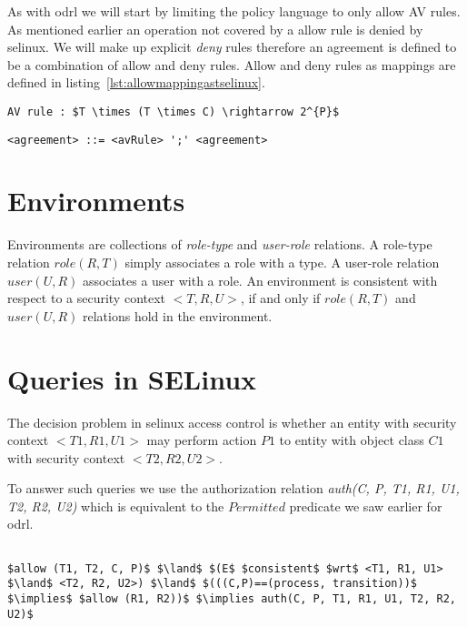 As with \ac{odrl} we will start by limiting the policy language to only allow AV rules. As mentioned earlier an operation not covered by a allow rule is denied by \ac{selinux}. We will make up explicit \emph{deny} rules therefore an agreement is defined to be a combination of allow and deny rules. Allow and deny rules as mappings are defined in listing~\ref{lst:allowmappingastselinux}.

\lstset{language=AST}
\begin{lstlisting}[frame=single, caption={'allow'/'deny' Rule as a Mapping},label={lst:allowmappingastselinux}]
AV rule : $T \times (T \times C) \rightarrow 2^{P}$
\end{lstlisting}

\lstset{language=AST}
\begin{lstlisting}[frame=single, caption={\ac{selinux} Agreement},label={lst:agreementastselinux}]
<agreement> ::= <avRule> ';' <agreement> 
\end{lstlisting}


\section{Environments}

Environments are collections of \emph{role-type} and \emph{user-role} relations. A role-type relation $role(R, T)$ simply associates a role with a type. A user-role relation $user(U, R)$ associates a user with a role. An environment is consistent with respect to a security context $<T, R, U>$, if and only if $role(R, T)$ and $user(U, R)$ relations hold in the environment. 

\section{Queries in SELinux}

The decision problem in \ac{selinux} access control is whether an entity with security context $<T1, R1, U1>$ may perform action $P1$ to entity with object class $C1$ with security context $<T2, R2, U2>$.

To answer such queries we use the authorization relation \emph{auth(C, P, T1, R1, U1, T2, R2, U2)} which is equivalent to the $Permitted$ predicate we saw earlier for \ac{odrl}.

\lstset{mathescape, language=AST} 
\begin{lstlisting}[frame=single, caption={$f^{+}_q$ for \ac{selinux}},label={lst:fqplussel}]

$allow (T1, T2, C, P)$ $\land$ $(E$ $consistent$ $wrt$ <T1, R1, U1> $\land$ <T2, R2, U2>) $\land$ $(((C,P)==(process, transition))$ $\implies$ $allow (R1, R2))$ $\implies auth(C, P, T1, R1, U1, T2, R2, U2)$ 

\end{lstlisting}

